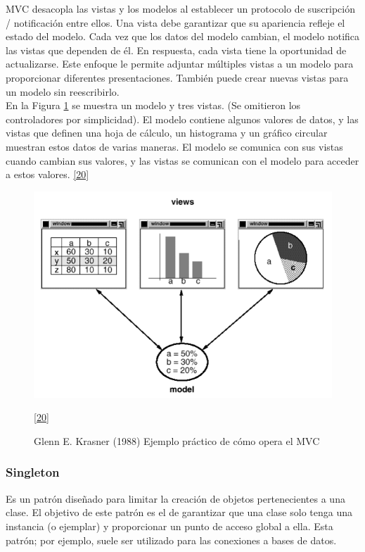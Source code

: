MVC desacopla las vistas y los modelos al establecer un protocolo de suscripción / notificación entre ellos. Una vista debe garantizar que su apariencia refleje el estado del modelo. Cada vez que los datos del modelo cambian, el modelo notifica las vistas que dependen de él. En respuesta, cada vista tiene la oportunidad de actualizarse. Este enfoque le permite adjuntar múltiples vistas a un modelo para proporcionar diferentes presentaciones. También puede crear nuevas vistas para un modelo sin reescribirlo.\\

En la Figura \ref{fig:mvc2} se muestra un modelo y tres vistas. (Se omitieron los controladores por simplicidad). El modelo contiene algunos valores de datos, y las vistas que definen una hoja de cálculo, un histograma y un gráfico circular muestran estos datos de varias maneras. El modelo se comunica con sus vistas cuando cambian sus valores, y las vistas se comunican con el modelo para acceder a estos valores. \hyperlink{b20}{[20]} 

\begin{figure}[H]
	\begin{center}
		\includegraphics[width=.65\textwidth]{images/marcoteorico/mvc2}
		\caption{Glenn E. Krasner (1988) Ejemplo práctico de cómo opera el MVC}
		\hyperlink{b20}{[20]} 
		\label{fig:mvc2}
	\end{center}
\end{figure}

\subsubsection{Singleton}
Es un patrón diseñado para limitar la creación de objetos pertenecientes a una clase. El objetivo de este patrón es el de garantizar que una clase solo tenga una instancia (o ejemplar) y proporcionar un punto de acceso global a ella. Esta patrón; por ejemplo, suele ser utilizado para las conexiones a bases de datos.

